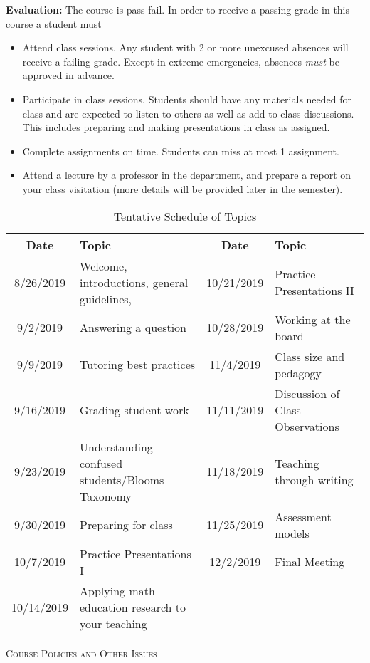 \documentclass[12pt]{article}
\newcommand\bi{\begin{itemize}}
\newcommand\ei{\end{itemize}}
\begin{document}
\textbf{Evaluation:} The course is pass fail. In order to receive a passing grade in this course a student must
\bi
\item Attend class sessions. Any student with 2 or more unexcused absences will receive a failing grade. Except in extreme emergencies, absences {\em must} be approved in advance. 
\item Participate in class sessions. Students should have any materials needed for class and are expected to listen to others as well as add to class discussions. This includes preparing and making presentations in class as assigned.
\item Complete assignments on time. Students can miss at most 1 assignment.
\item Attend a lecture by a professor in the department, and prepare a report on your class visitation (more details will be provided later in the semester).
\ei
\begin{table}[htp]
\caption*{Tentative Schedule of Topics }
\begin{center}
\begin{tabular}{c|p{2in}||c|p{2in}}
{Date}&{Topic}&{Date}&{Topic}\\
\hline\hline
8/26/2019 & Welcome, introductions, general guidelines,& 10/21/2019 & Practice Presentations II \\
9/2/2019 & Answering a question & 10/28/2019 & Working at the board \\
9/9/2019 & Tutoring best practices & 11/4/2019 & Class size and pedagogy \\
9/16/2019 & Grading student work & 11/11/2019 & Discussion of Class Observations \\
9/23/2019 & Understanding confused students/Blooms Taxonomy & 11/18/2019 & Teaching through writing \\
9/30/2019 & Preparing for class & 11/25/2019 & Assessment models\\
10/7/2019 & Practice Presentations I & 12/2/2019 & Final Meeting \\
10/14/2019 & Applying math education research to your teaching \\


\end{tabular}
\end{center}
\label{default}
\end{table}%


\textsc{Course Policies and Other Issues}
\end{document}
